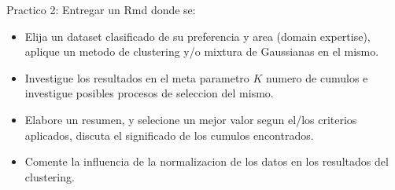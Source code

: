 \documentclass[ignorenonframetext,]{beamer}
\begin{document}
\begin{frame}{Practico 2: Entregar un Rmd donde se:}

\begin{itemize}
\item
  Elija un dataset clasificado de su preferencia y area (domain
  expertise), aplique un metodo de clustering y/o mixtura de Gaussianas
  en el mismo.
\item
  Investigue los resultados en el meta parametro \(K\) numero de cumulos
  e investigue posibles procesos de seleccion del mismo.
\item
  Elabore un resumen, y selecione un mejor valor segun el/los criterios
  aplicados, discuta el significado de los cumulos encontrados.
\item
  Comente la influencia de la normalizacion de los datos en los
  resultados del clustering.
\end{itemize}

\end{frame}
\end{document}
